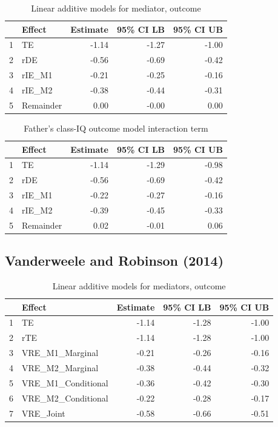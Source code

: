 \documentclass[12pt]{article} %
\numberwithin{equation}{section} %
\begin{document}
\begin{table}[ht]
\centering
\begin{tabular}{rlrrr}
  \hline
 & Effect & Estimate & 95\% CI LB & 95\% CI UB \\ 
  \hline
1 & TE & -1.14 & -1.27 & -1.00 \\ 
  2 & rDE & -0.56 & -0.69 & -0.42 \\ 
  3 & rIE\_M1 & -0.21 & -0.25 & -0.16 \\ 
  4 & rIE\_M2 & -0.38 & -0.44 & -0.31 \\ 
  5 & Remainder & 0.00 & -0.00 & 0.00 \\ 
   \hline
\end{tabular}
\caption{Linear additive models for mediator, outcome}
\end{table}

\begin{table}[ht]
\centering
\begin{tabular}{rlrrr}
  \hline
 & Effect & Estimate & 95\% CI LB & 95\% CI UB \\ 
  \hline
1 & TE & -1.14 & -1.29 & -0.98 \\ 
  2 & rDE & -0.56 & -0.69 & -0.42 \\ 
  3 & rIE\_M1 & -0.22 & -0.27 & -0.16 \\ 
  4 & rIE\_M2 & -0.39 & -0.45 & -0.33 \\ 
  5 & Remainder & 0.02 & -0.01 & 0.06 \\ 
   \hline
\end{tabular}
\caption{Father's class-IQ outcome model interaction term}
\end{table}

\subsection{Vanderweele and Robinson (2014)}

\begin{table}[ht]
\centering
\begin{tabular}{rlrrr}
  \hline
 & Effect & Estimate & 95\% CI LB & 95\% CI UB \\ 
  \hline
1 & TE & -1.14 & -1.28 & -1.00 \\ 
  2 & rTE & -1.14 & -1.28 & -1.00 \\ 
  3 & VRE\_M1\_Marginal & -0.21 & -0.26 & -0.16 \\ 
  4 & VRE\_M2\_Marginal & -0.38 & -0.44 & -0.32 \\ 
  5 & VRE\_M1\_Conditional & -0.36 & -0.42 & -0.30 \\ 
  6 & VRE\_M2\_Conditional & -0.22 & -0.28 & -0.17 \\ 
  7 & VRE\_Joint & -0.58 & -0.66 & -0.51 \\ 
   \hline
\end{tabular}
\caption{Linear additive models for mediators, outcome}
\end{table}
\end{document}
